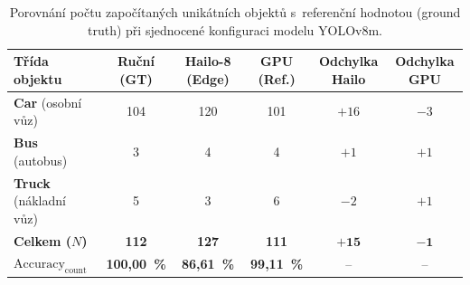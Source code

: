 \begin{table}[H]
    \centering
    \small\renewcommand{\arraystretch}{1.2}
    \setlength{\tabcolsep}{3pt}
    \begin{tabular}{|l|c|c|c|c|c|}
        \hline
        \textbf{Třída objektu} & \textbf{Ruční (GT)} & \textbf{Hailo-8 (Edge)} & \textbf{GPU (Ref.)} & \textbf{Odchylka Hailo} & \textbf{Odchylka GPU} \\ \hline
        \textbf{Car} (osobní vůz) & 104 & 120 & 101 & $+16$ & $-3$ \\ \hline
        \textbf{Bus} (autobus) & 3 & 4 & 4 & $+1$ & $+1$ \\ \hline
        \textbf{Truck} (nákladní vůz) & 5 & 3 & 6 & $-2$ & $+1$ \\ \hline
        \textbf{Celkem ($N$)} & \textbf{112} & \textbf{127} & \textbf{111} & $\mathbf{+15}$ & $\mathbf{-1}$ \\ \hline
        \textbf{$\text{Accuracy}_{\text{count}}$} & \textbf{100,00~\%} & \textbf{86,61~\%} & \textbf{99,11~\%} & -- & -- \\ \hline
    \end{tabular}
    \caption{Porovnání počtu započítaných unikátních objektů s~referenční hodnotou (ground truth) při sjednocené konfiguraci modelu YOLOv8m.}
    \label{tab:counting_results}
\end{table}

